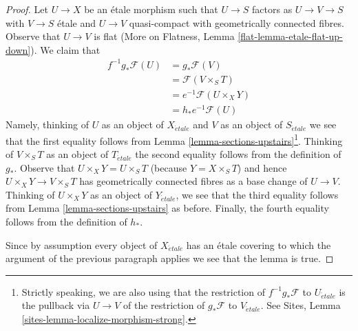 \documentclass[10pt,a4paper]{amsart}
\theoremstyle{plain}
\theoremstyle{definition}
\theoremstyle{remark}
\numberwithin{equation}{subsection}
\def\etale{{\acute{e}tale}}
\begin{document}
\begin{proof}
Let $U \to X$ be an \'etale morphism such that $U \to S$ factors as
$U \to V \to S$ with $V \to S$ \'etale and $U \to V$ quasi-compact
with geometrically connected fibres. Observe that $U \to V$ is flat
(More on Flatness, Lemma \ref{flat-lemma-etale-flat-up-down}).
We claim that
\begin{align*}
f^{-1}g_*\mathcal{F}(U)
& = g_*\mathcal{F}(V) \\
& = \mathcal{F}(V \times_S T) \\
& = e^{-1}\mathcal{F}(U \times_X Y) \\
& = h_*e^{-1}\mathcal{F}(U)
\end{align*}
Namely, thinking of $U$ as an object of $X_\etale$ and
$V$ as an object of $S_\etale$ we see that the first equality
follows from Lemma \ref{lemma-sections-upstairs}\footnote{Strictly
speaking, we are also using that the restriction of $f^{-1}g_*\mathcal{F}$
to $U_\etale$ is the pullback via $U \to V$ of the restriction of
$g_*\mathcal{F}$ to $V_\etale$. See
Sites, Lemma \ref{sites-lemma-localize-morphism-strong}.}.
Thinking of $V \times_S T$ as an object of $T_\etale$
the second equality follows from the definition of $g_*$.
Observe that $U \times_X Y = U \times_S T$ (because $Y = X \times_S T$)
and hence $U \times_X Y \to V \times_S T$
has geometrically connected fibres as a base change of $U \to V$.
Thinking of $U \times_X Y$ as an object of $Y_\etale$, we see that
the third equality  follows from Lemma \ref{lemma-sections-upstairs}
as before. Finally, the fourth equality follows from the definition
of $h_*$.

\medskip\noindent
Since by assumption every object of $X_\etale$ has an \'etale
covering to which the argument of the previous paragraph applies
we see that the lemma is true.
\end{proof}
\end{document}
